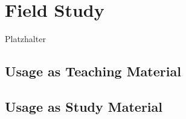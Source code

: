 \section{Field Study}
Platzhalter\\

\subsection{Usage as Teaching Material}
\subsection{Usage as Study Material}

